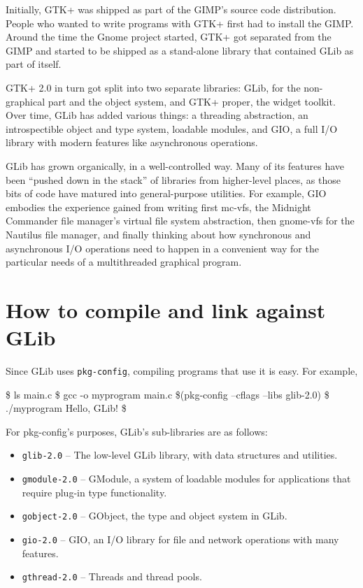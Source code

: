 Initially, GTK+ was shipped as part of the GIMP's source code
distribution.  People who wanted to write programs with GTK+ first had
to install the GIMP.  Around the time the Gnome project started, GTK+
got separated from the GIMP and started to be shipped as a stand-alone
library that contained GLib as part of itself.

GTK+ 2.0 in turn got split into two separate libraries:  GLib, for the
non-graphical part and the object system, and GTK+ proper, the widget
toolkit.  Over time, GLib has added various things:  a threading
abstraction, an introspectible object and type system, loadable
modules, and GIO, a full I/O library with modern features like
asynchronous operations.

GLib has grown organically, in a well-controlled way.  Many of its
features have been ``pushed down in the stack'' of libraries from
higher-level places, as those bits of code have matured into
general-purpose utilities.  For example, GIO embodies the experience
gained from writing first mc-vfs, the Midnight Commander file
manager's virtual file system abstraction, then gnome-vfs for the
Nautilus file manager, and finally thinking about how synchronous and
asynchronous I/O operations need to happen in a convenient way for the
particular needs of a multithreaded graphical program.

\section{How to compile and link against GLib}

Since GLib uses \verb|pkg-config|, compiling programs that use it is
easy.  For example,

\begin{code}{}
\$ ls
main.c
\$ gcc -o myprogram main.c \$(pkg-config --cflags --libs glib-2.0)
\$ ./myprogram
Hello, GLib!
\$
\end{code}

For pkg-config's purposes, GLib's sub-libraries are as follows:

\begin{itemize}
\item \verb|glib-2.0| -- The low-level GLib library, with data
  structures and utilities.
\item \verb|gmodule-2.0| -- GModule, a system of loadable modules for
  applications that require plug-in type functionality.
\item \verb|gobject-2.0| -- GObject, the type and object system in GLib.
\item \verb|gio-2.0| -- GIO, an I/O library for file and network
  operations with many features.
\item \verb|gthread-2.0| -- Threads and thread pools.
\end{itemize}
